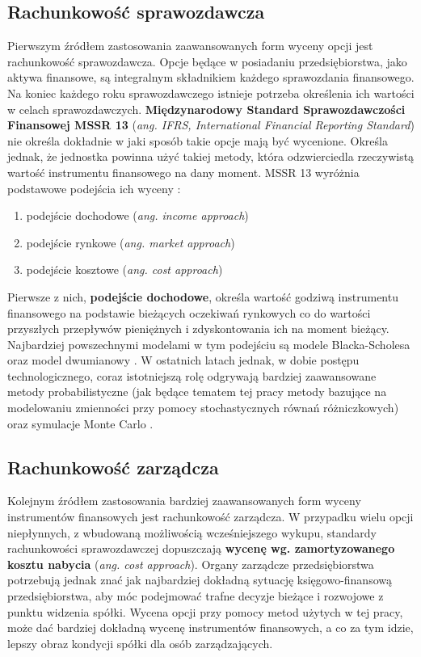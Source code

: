 \documentclass{pracamgr}
\begin{document}
\subsection{Rachunkowość sprawozdawcza} %
\label{sub:rachunkowosc_sprawozdawcza}
Pierwszym źródłem zastosowania zaawansowanych form wyceny opcji jest rachunkowość sprawozdawcza.
Opcje będące w posiadaniu przedsiębiorstwa, jako aktywa finansowe, są integralnym składnikiem każdego 
sprawozdania finansowego. Na koniec 
każdego roku sprawozdawczego istnieje potrzeba określenia ich wartości w celach sprawozdawczych.
\textbf{Międzynarodowy Standard Sprawozdawczości Finansowej MSSR 13} 
(\textit{ang. IFRS, International Financial Reporting Standard}) 
nie określa dokładnie w jaki sposób takie opcje mają być wycenione. 
Określa jednak, że jednostka powinna użyć takiej metody, która odzwierciedla
rzeczywistą  wartość instrumentu finansowego na dany moment. MSSR 13 wyróżnia podstawowe podejścia 
ich wyceny \cite{IFRS2013}:
\begin{enumerate}
  \item podejście dochodowe (\textit{ang. income approach})
  \item podejście rynkowe (\textit{ang. market approach})
  \item podejście kosztowe (\textit{ang. cost approach})
\end{enumerate}
Pierwsze z nich, \textbf{podejście dochodowe}, określa wartość godziwą instrumentu finansowego na 
podstawie bieżących oczekiwań rynkowych co do wartości 
przyszłych przepływów pieniężnych i zdyskontowania ich na moment bieżący. Najbardziej powszechnymi 
modelami w tym podejściu są modele Blacka-Scholesa 
oraz model dwumianowy  \cite{IFRS2013}. W ostatnich latach jednak, w dobie postępu technologicznego, 
coraz istotniejszą rolę odgrywają bardziej zaawansowane metody probabilistyczne
(jak będące tematem tej pracy metody bazujące na modelowaniu zmienności przy pomocy stochastycznych 
równań różniczkowych) oraz symulacje Monte Carlo  \cite{FairValue2010}.  


\subsection{Rachunkowość zarządcza} %
\label{sub:RachunkowoscZarzadcza}
Kolejnym źródłem zastosowania bardziej zaawansowanych form wyceny instrumentów finansowych jest 
rachunkowość zarządcza. 
W przypadku wielu opcji niepłynnych, z wbudowaną możliwością wcześniejszego wykupu, standardy 
rachunkowości sprawozdawczej dopuszczają
\textbf{wycenę wg. zamortyzowanego kosztu nabycia} (\textit{ang. cost approach}). Organy zarządcze 
przedsiębiorstwa potrzebują jednak znać jak najbardziej dokładną sytuację księgowo-finansową 
przedsiębiorstwa, aby móc podejmować trafne decyzje bieżące i rozwojowe z punktu widzenia spółki. 
Wycena opcji przy pomocy metod użytych w tej pracy, może dać bardziej dokładną wycenę instrumentów 
finansowych, a co za tym idzie, lepszy obraz kondycji spółki dla osób zarządzających.  
\end{document}
